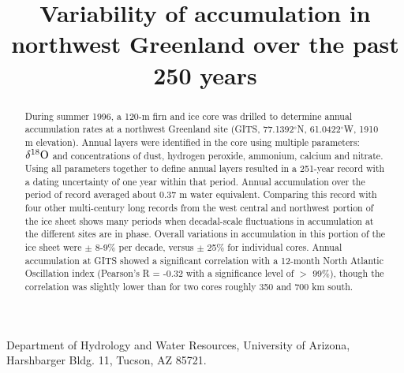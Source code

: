\documentclass[jgrga]{agu2001}
\begin{document}
\title{Variability of accumulation in northwest Greenland over the past 250
years}











{Department of Hydrology and Water Resources, University of Arizona,
Harshbarger Bldg. 11, Tucson, AZ 85721.}




\begin{abstract}
During summer 1996, a 120-m firn and ice core was
drilled to determine annual accumulation rates
at a northwest Greenland site (GITS, 77.1392$^\circ$N, 61.0422$^\circ$W,
1910 m elevation).
Annual layers were identified in 
the core using multiple parameters:
$\delta^{18} \rm O$ and
concentrations of dust, hydrogen peroxide, ammonium, calcium and nitrate.
Using all parameters together to define annual layers resulted in
a 251-year record with a dating uncertainty of one year within that
period.
Annual accumulation over the period of record 
averaged about 0.37 m water equivalent.
Comparing this record with four other multi-century long records from the
west central and northwest portion of the ice sheet shows many periods
when decadal-scale fluctuations in
accumulation at
the different sites are in phase.
Overall variations in accumulation in this portion of the ice sheet were
$\pm$ 8-9\% per decade, versus $\pm$ 25\% for individual cores.
Annual accumulation at GITS showed a significant correlation with a 12-month North
Atlantic Oscillation index (Pearson's R = -0.32 with a significance level
of $>$ 99\%),
though the correlation was
slightly lower than for two cores roughly 350 and 700 km south.
\end{abstract}
\end{document}
